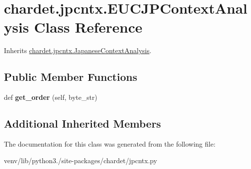 \hypertarget{classchardet_1_1jpcntx_1_1_e_u_c_j_p_context_analysis}{}\section{chardet.\+jpcntx.\+E\+U\+C\+J\+P\+Context\+Analysis Class Reference}
\label{classchardet_1_1jpcntx_1_1_e_u_c_j_p_context_analysis}


Inherits \hyperlink{classchardet_1_1jpcntx_1_1_japanese_context_analysis}{chardet.\+jpcntx.\+Japanese\+Context\+Analysis}.

\subsection*{Public Member Functions}
\begin{DoxyCompactItemize}
\item 
\mbox{\label{classchardet_1_1jpcntx_1_1_e_u_c_j_p_context_analysis_a99e8e8f155d9b637edc396cf35b46332}} 
def {\bfseries get\+\_\+order} (self, byte\+\_\+str)
\end{DoxyCompactItemize}
\subsection*{Additional Inherited Members}


The documentation for this class was generated from the following file\+:\begin{DoxyCompactItemize}
\item 
venv/lib/python3./site-\/packages/chardet/jpcntx.\+py\end{DoxyCompactItemize}
